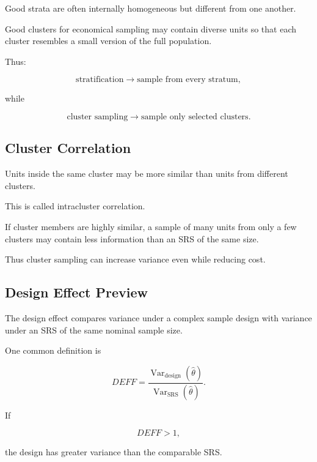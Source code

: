 Good strata are often internally homogeneous but different from one
another.

Good clusters for economical sampling may contain diverse units so that
each cluster resembles a small version of the full population.

Thus:

\[
\boxed{
\text{stratification}
\rightarrow
\text{sample from every stratum},
}
\]

while

\[
\boxed{
\text{cluster sampling}
\rightarrow
\text{sample only selected clusters}.
}
\]

\subsection{Cluster Correlation}
\label{subsec:cluster-correlation}

Units inside the same cluster may be more similar than units from
different clusters.

This is called intracluster correlation.

If cluster members are highly similar, a sample of many units from only
a few clusters may contain less information than an SRS of the same
size.

Thus cluster sampling can increase variance even while reducing cost.

\subsection{Design Effect Preview}
\label{subsec:design-effect-preview}

The design effect compares variance under a complex sample design with
variance under an SRS of the same nominal sample size.

One common definition is

\[
\boxed{
DEFF
=
\frac{
\operatorname{Var}_{\text{design}}(\widehat{\theta})
}{
\operatorname{Var}_{\text{SRS}}(\widehat{\theta})
}.
}
\]

If

\[
DEFF>1,
\]

the design has greater variance than the comparable SRS.

